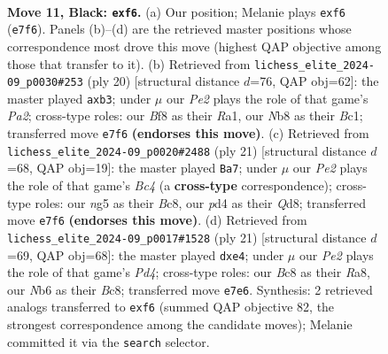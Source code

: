 \documentclass[11pt]{article}
\begin{document}
\clearpage

\begin{figure}[p]\centering
\begin{subfigure}{0.46\textwidth}\centering
\resizebox{\linewidth}{!}{%
\newchessgame
\chessboard[
  setfen={rnbqkb1r/ppp1p3/1n3Pp1/3p2Np/P2P4/NB6/1PP2PPP/R1BQ1RK1 b kq - 0 11},
  showmover=false,
  pgfstyle=straightmove, color=movearrow, markmove={e7-f6}
]}
\caption{}
\end{subfigure}\hfill
\begin{subfigure}{0.46\textwidth}\centering
\resizebox{\linewidth}{!}{%
\newchessgame
\chessboard[
  setfen={rnbq1rk1/2p2ppp/p3p3/1p1nN3/1b1PN3/1p4P1/P3PPBP/R1BQ1RK1 w - - 0 11},
  showmover=false,
  pgfstyle=straightmove, color=movearrow, markmove={a2-b3}
]}
\caption{}
\end{subfigure}
\\[4pt]
\begin{subfigure}{0.46\textwidth}\centering
\resizebox{\linewidth}{!}{%
\newchessgame
\chessboard[
  setfen={r1bq1rk1/1pp1npp1/p2p1n1p/2b5/3PP3/5N1P/PPB2PP1/RNBQ1RK1 b - - 0 11},
  showmover=false,
  pgfstyle=straightmove, color=movearrow, markmove={c5-a7}
]}
\caption{}
\end{subfigure}\hfill
\begin{subfigure}{0.46\textwidth}\centering
\resizebox{\linewidth}{!}{%
\newchessgame
\chessboard[
  setfen={r1bq1rk1/ppp2pb1/5n1p/3pN1p1/4P3/1BPP4/PP3PPP/R1BQ1RK1 b - - 0 11},
  showmover=false,
  pgfstyle=straightmove, color=movearrow, markmove={d5-e4}
]}
\caption{}
\end{subfigure}
\caption{\textbf{Move 11, Black: \texttt{exf6}.} (a) Our position; Melanie plays \texttt{exf6} (\texttt{e7f6}). Panels (b)--(d) are the retrieved master positions whose correspondence most drove this move (highest QAP objective among those that transfer to it). (b) Retrieved from \texttt{lichess\_elite\_2024-09\_p0030\#253} (ply 20) [structural distance $d$=76, QAP obj=62]: the master played \texttt{axb3}; under $\mu$ our \emph{Pe2} plays the role of that game's \emph{Pa2}; cross-type roles: our \emph{B}f8 as their \emph{R}a1, our \emph{N}b8 as their \emph{B}c1; transferred move \texttt{e7f6} \textbf{(endorses this move)}. (c) Retrieved from \texttt{lichess\_elite\_2024-09\_p0020\#2488} (ply 21) [structural distance $d$=68, QAP obj=19]: the master played \texttt{Ba7}; under $\mu$ our \emph{Pe2} plays the role of that game's \emph{Bc4} (a \textbf{cross-type} correspondence); cross-type roles: our \emph{n}g5 as their \emph{B}c8, our \emph{p}d4 as their \emph{Q}d8; transferred move \texttt{e7f6} \textbf{(endorses this move)}. (d) Retrieved from \texttt{lichess\_elite\_2024-09\_p0017\#1528} (ply 21) [structural distance $d$=69, QAP obj=68]: the master played \texttt{dxe4}; under $\mu$ our \emph{Pe2} plays the role of that game's \emph{Pd4}; cross-type roles: our \emph{B}c8 as their \emph{R}a8, our \emph{N}b6 as their \emph{B}c8; transferred move \texttt{e7e6}. Synthesis: 2 retrieved analogs transferred to \texttt{exf6} (summed QAP objective 82, the strongest correspondence among the candidate moves); Melanie committed it via the \texttt{search} selector.}
\label{fig:thought-m21}
\end{figure}
\end{document}
